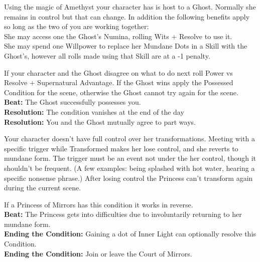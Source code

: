 \documentclass[10pt, frontgrid, backgrid]{flacards}
\begin{document}
{Using the magic of Amethyst your character has is host to a Ghost. Normally she remains in control but that can change. In addition the following benefits apply so long as the two of you are working together: \\
She may access one the Ghost's Numina, rolling Wits + Resolve to use it.\\
She may spend one Willpower to replace her Mundane Dots in a Skill with the Ghost's, however all rolls made using that Skill are at a -1 penalty.  

If your character and the Ghost disagree on what to do next roll Power vs Resolve + Supernatural Advantage. If the Ghost wins apply the Possessed Condition for the scene, otherwise the Ghost cannot try again for the scene. \\

\textbf{Beat:} The Ghost successfully possesses you.\\ 
\textbf{Resolution:} The condition vanishes at the end of the day\\
\textbf{Resolution:} You and the Ghost mutually agree to part ways.}

{
Your character doesn’t have full control over her transformations. Meeting with a specific trigger while Transformed makes her lose control, and she reverts to mundane form. The trigger must be an event not under the her control, though it shouldn’t be frequent. (A few examples: being splashed with hot water, hearing a specific nonsense phrase.) After losing control the Princess can’t transform again during the current scene.

If a Princess of Mirrors has this condition it works in reverse.\\

\textbf{Beat:} The Princess gets into difficulties due to involuntarily returning to her mundane form.\\
\textbf{Ending the Condition:} Gaining a dot of Inner Light can optionally resolve this Condition.\\
\textbf{Ending the Condition:} Join or leave the Court of Mirrors.
}


\end{document}

